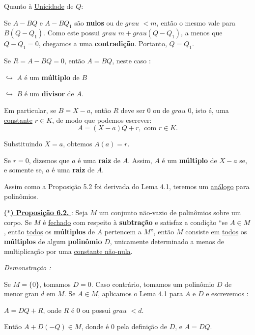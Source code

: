 Quanto à \underline{Unicidade} de $Q$: 

Se $A - BQ$ e $A - BQ_1$ são \textbf{nulos} ou de $grau$ $< m$, então o mesmo vale para $B(Q - Q_1)$.  
Como este possui $grau$ $m + grau(Q - Q_1)$, a menos que $Q - Q_1 = 0$, chegamos a uma \textbf{contradição}.  
Portanto, $Q = Q_1$.  

\vspace{0.3cm}

Se $R = A - BQ = 0$, então $A = BQ$, neste caso :  

$\hookrightarrow$ $A$ é um \textbf{múltiplo} de $B$ 

$\hookrightarrow$ $B$ é um \textbf{divisor} de $A$.  

Em particular, se $B = X - a$, então $R$ deve ser $0$ ou de $grau$ $0$, isto é, uma \underline{constante} $r \in K$, de modo que podemos escrever:
\[
A = (X - a)Q + r, \text{ com } r \in K.
\]

Substituindo $X = a$, obtemos $\boxed{A(a) = r}$.  

Se $r = 0$, dizemos que $a$ é uma \textbf{raiz} de $A$.  
Assim, $A$ é um \textbf{múltiplo} de $X - a$ se, e somente se, $a$ é uma \textbf{raiz} de $A$.  

Assim como a Proposição 5.2 foi derivada do Lema 4.1, teremos um \underline{análogo} para polinômios.

\vspace{0.3cm}
\noindent\underline{\underline{\textbf{($\ast$) Proposição 6.2. }}} : Seja $M$ um conjunto não-vazio de polinômios sobre um corpo. 
Se $M$ é \underline{fechado} com respeito à \textbf{subtração} e satisfaz a condição “se $A \in M$, então \underline{todos} 
os \textbf{múltiplos} de $A$ pertencem a $M$”, então $M$ consiste em \underline{todos} os \textbf{múltiplos} de algum \textbf{polinômio} $D$, unicamente determinado a menos de
multiplicação por uma \underline{constante não-nula}.

\vspace{0.2cm}
\noindent\textit{Demonstração : }

Se $M = \{0\}$, tomamos $D = 0$. Caso contrário, tomamos um polinômio $D$ 
de menor grau $d$ em $M$. Se $A \in M$, aplicamos o Lema 4.1 para $A$ e $D$ e escrevemos : 
\begin{center}
$A = DQ + R$, onde $R$ é $0$ ou possui $grau$ $< d$. 
\end{center}

Então $A + D(-Q) \in M$, donde é $0$ pela definição de $D$, e $A = DQ$. 

